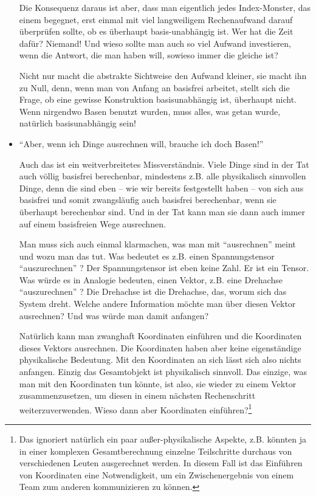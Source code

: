 \begin{remark}
\begin{itemize}
Die Konsequenz daraus ist aber, dass man eigentlich jedes Index-Monster, das einem begegnet, erst einmal mit viel langweiligem Rechenaufwand darauf überprüfen sollte, ob es überhaupt basis-unabhängig ist. Wer hat die Zeit dafür? Niemand! Und wieso sollte man auch so viel Aufwand investieren, wenn die Antwort, die man haben will, sowieso immer die gleiche ist?

Nicht nur macht die abstrakte Sichtweise den Aufwand kleiner, sie macht ihn zu Null, denn, wenn man von Anfang an basisfrei arbeitet, stellt sich die Frage, ob eine gewisse Konstruktion basisunabhängig ist, überhaupt nicht. Wenn nirgendwo Basen benutzt wurden, muss alles, was getan wurde, natürlich basisunabhängig sein!

\item \enquote{Aber, wenn ich Dinge ausrechnen will, brauche ich doch Basen!}

Auch das ist ein weitverbreitetes Missverständnis. Viele Dinge sind in der Tat auch völlig basisfrei berechenbar, mindestens z.B. alle physikalisch sinnvollen Dinge, denn die sind eben -- wie wir bereits festgestellt haben --  von sich aus basisfrei und somit zwangsläufig auch basisfrei berechenbar, wenn sie überhaupt berechenbar sind. Und in der Tat kann man sie dann auch immer auf einem basisfreien Wege ausrechnen. 

Man muss sich auch einmal klarmachen, was man mit \enquote{ausrechnen} meint und wozu man das tut. Was bedeutet es z.B. einen Spannungstensor \enquote{auszurechnen} ? Der Spannungstensor ist eben keine Zahl. Er ist ein Tensor. Was würde es in Analogie bedeuten, einen Vektor, z.B. eine Drehachse \enquote{auszurechnen} ? Die Drehachse ist die Drehachse, das, worum sich das System dreht. Welche andere Information möchte man über diesen Vektor ausrechnen? Und was würde man damit anfangen?

Natürlich kann man zwanghaft Koordinaten einführen und die Koordinaten dieses Vektors ausrechnen. Die Koordinaten haben aber keine eigenständige physikalische Bedeutung. Mit den Koordinaten an sich lässt sich also nichts anfangen. Einzig das Gesamtobjekt ist physikalisch sinnvoll. Das einzige, was man mit den Koordinaten tun könnte, ist also, sie wieder zu einem Vektor zusammenzusetzen, um diesen in einem nächsten Rechenschritt weiterzuverwenden. Wieso dann aber Koordinaten einführen?\footnote{Das ignoriert natürlich ein paar außer-physikalische Aspekte, z.B. könnten ja in einer komplexen Gesamtberechnung einzelne Teilschritte durchaus von verschiedenen Leuten ausgerechnet werden. In diesem Fall ist das Einführen von Koordinaten eine Notwendigkeit, um ein Zwischenergebnis von einem Team zum anderen kommunizieren zu können.}


\end{itemize}
\end{remark}
